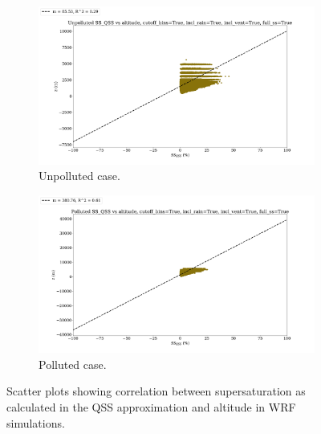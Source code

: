 \documentclass{article}
\begin{document}
\begin{figure}[ht]
	\centering
	\begin{subfigure}{0.7\textwidth}
		\includegraphics[width=\textwidth]{revmywrf/v12_ss_qss_vs_z_Unpolluted_figure.png}
		\caption{Unpolluted case.}
		\label{wrfssqssvszunpoll}
	\end{subfigure}
	\begin{subfigure}{0.7\textwidth}
		\includegraphics[width=\textwidth]{revmywrf/v12_ss_qss_vs_z_Polluted_figure.png}
		\caption{Polluted case.}
		\label{wrfssqssvszpoll}
	\end{subfigure}
	\caption{Scatter plots showing correlation between supersaturation as calculated in the QSS approximation and altitude in WRF simulations.}
	\label{wrfssqssvsz}
\end{figure}

\clearpage
\newpage
\end{document}
